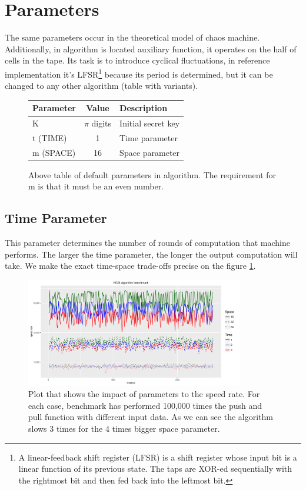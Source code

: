 \documentclass[twocolumn, a4paper, 10pt]{article}
\begin{document}

\section{Parameters}

The same parameters occur in the theoretical model of chaos machine. Additionally, in algorithm is located auxiliary function, it operates on the half of cells in the tape. Its task is to introduce cyclical fluctuations, in reference implementation it's LFSR\footnote{A linear-feedback shift register (LFSR) is a shift register whose input bit is a linear function of its previous state. The taps are XOR-ed sequentially with the rightmost bit and then fed back into the leftmost bit.} because its period is determined, but it can be changed to any other algorithm (table with variants).

\begin{figure}[ht]
  \centering
  \begin{tabular}{lcl}
    Parameter            & Value & Description \\
    \hline
    $\text{K}$           & $\pi$ digits & Initial secret key \\
    $\text{t}$ (TIME)    & 1            & Time parameter \\
    $\text{m}$ (SPACE)   & 16           & Space parameter
  \end{tabular}
  \caption{Above table of default parameters in algorithm. The requirement for $\text{m}$ is that it must be an even number.}
\end{figure}

\subsection{Time Parameter}

This parameter determines the number of rounds of computation that machine performs. The larger the time parameter, the longer the output computation will take. We make the exact time-space trade-offs precise on the figure \ref{result-benchmark}.

\begin{figure}[ht]
  \centering
  \includegraphics[width=9.50cm]{ncg-speed-benchmark}
  \caption{Plot that shows the impact of parameters to the speed rate. For each case, benchmark has performed 100,000 times the push and pull function with different input data. As we can see the algorithm slows 3 times for the 4 times bigger space parameter.}
  \label{result-benchmark}
\end{figure}
\end{document}
